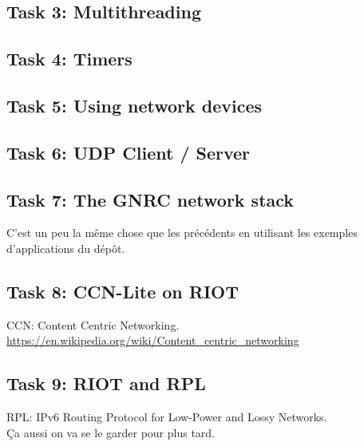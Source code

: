 \documentclass[a4paper,12pt, twoside]{article}
\begin{document}
\subsection{Task 3: Multithreading}


\subsection{Task 4: Timers}


\subsection{Task 5: Using network devices}


\subsection{Task 6: UDP Client / Server}


\subsection{Task 7: The GNRC network stack}
C'est un peu la même chose que les précédents en utilisant les
exemples d'applications du dépôt.

\subsection{Task 8: CCN-Lite on RIOT}
CCN: Content Centric Networking.\\
\url{https://en.wikipedia.org/wiki/Content_centric_networking}

\subsection{Task 9: RIOT and RPL}
RPL: IPv6 Routing Protocol for Low-Power and Lossy Networks.\\
Ça aussi on va se le garder pour plus tard.
\end{document}
